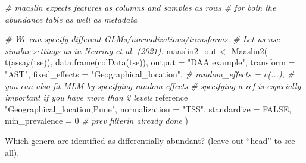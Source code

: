 \documentclass[
]{book}
\newenvironment{Shaded}{\begin{snugshade}}{\end{snugshade}}
\newcommand{\AttributeTok}[1]{\textcolor[rgb]{0.77,0.63,0.00}{#1}}
\newcommand{\CommentTok}[1]{\textcolor[rgb]{0.56,0.35,0.01}{\textit{#1}}}
\newcommand{\ConstantTok}[1]{\textcolor[rgb]{0.00,0.00,0.00}{#1}}
\newcommand{\DecValTok}[1]{\textcolor[rgb]{0.00,0.00,0.81}{#1}}
\newcommand{\FloatTok}[1]{\textcolor[rgb]{0.00,0.00,0.81}{#1}}
\newcommand{\FunctionTok}[1]{\textcolor[rgb]{0.00,0.00,0.00}{#1}}
\newcommand{\NormalTok}[1]{#1}
\newcommand{\OtherTok}[1]{\textcolor[rgb]{0.56,0.35,0.01}{#1}}
\newcommand{\SpecialCharTok}[1]{\textcolor[rgb]{0.00,0.00,0.00}{#1}}
\newcommand{\StringTok}[1]{\textcolor[rgb]{0.31,0.60,0.02}{#1}}
\begin{document}
\begin{Shaded}
\begin{Highlighting}[]
\CommentTok{\# maaslin expects features as columns and samples as rows }
\CommentTok{\# for both the abundance table as well as metadata }

\CommentTok{\# We can specify different GLMs/normalizations/transforms.}
\CommentTok{\# Let us use similar settings as in Nearing et al. (2021):}
\NormalTok{maaslin2\_out }\OtherTok{\textless{}{-}} \FunctionTok{Maaslin2}\NormalTok{(}
  \FunctionTok{t}\NormalTok{(}\FunctionTok{assay}\NormalTok{(tse)),}
  \FunctionTok{data.frame}\NormalTok{(}\FunctionTok{colData}\NormalTok{(tse)),}
  \AttributeTok{output =} \StringTok{"DAA example"}\NormalTok{,}
  \AttributeTok{transform =} \StringTok{"AST"}\NormalTok{,}
  \AttributeTok{fixed\_effects =} \StringTok{"Geographical\_location"}\NormalTok{,}
  \CommentTok{\# random\_effects = c(...), \# you can also fit MLM by specifying random effects}
  \CommentTok{\# specifying a ref is especially important if you have more than 2 levels}
  \AttributeTok{reference =} \StringTok{"Geographical\_location,Pune"}\NormalTok{,  }
  \AttributeTok{normalization =} \StringTok{"TSS"}\NormalTok{,}
  \AttributeTok{standardize =} \ConstantTok{FALSE}\NormalTok{,}
  \AttributeTok{min\_prevalence =} \DecValTok{0} \CommentTok{\# prev filterin already done}
\NormalTok{)}
\end{Highlighting}
\end{Shaded}

Which genera are identified as differentially abundant? (leave out ``head'' to see all).

\begin{Shaded}
\end{Shaded}
\end{document}
